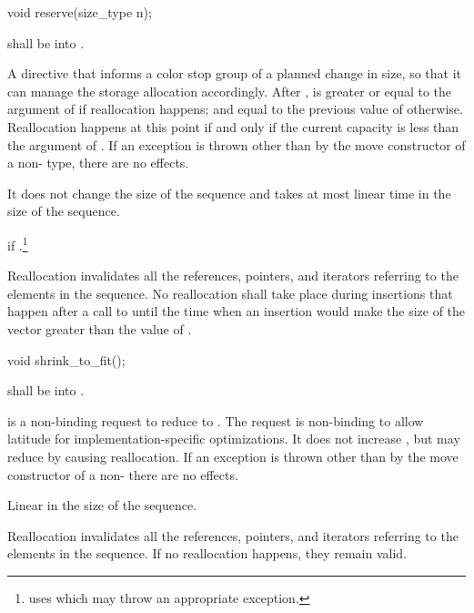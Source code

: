 \begin{itemdecl}
	void reserve(size_type n);
\end{itemdecl}
\begin{itemdescr}
	\pnum
	\requires
	 shall be  into .
	
	\pnum
	\effects
	A directive that informs a color stop group of a planned change in size, so that it can manage the storage
	allocation accordingly. After ,  is greater or equal to the argument of  if
	reallocation happens; and equal to the previous value of  otherwise. Reallocation happens
	at this point if and only if the current capacity is less than the argument of . If an exception
	is thrown other than by the move constructor of a non- type, there are no effects.
	
	\pnum
	\complexity
	It does not change the size of the sequence and takes at most linear time in the size of the
	sequence.
	
	\pnum
	\throws
	 if .\footnote{ uses  which
		may throw an appropriate exception.}
	
	\pnum
	\remarks
	Reallocation invalidates all the references, pointers, and iterators
	referring to the elements in the sequence.
	No reallocation shall take place during insertions that happen
	after a call to
	until the time when an insertion would make the size of the vector
	greater than the value of
	.
\end{itemdescr}

\begin{itemdecl}
	void shrink_to_fit();
\end{itemdecl}
\begin{itemdescr}
	\pnum
	\requires
	 shall be  into .
	
	\pnum
	\effects
	 is a non-binding request to reduce
	 to .
	\enternote
	The request is non-binding to allow latitude for
	implementation-specific optimizations.
	\exitnote
	It does not increase , but may reduce 
	by causing reallocation. 
	If an exception is thrown other than by the move constructor
	of a non-  there are no effects.
	
	\pnum
	\complexity Linear in the size of the sequence.
	
	\pnum
	\remarks Reallocation invalidates all the references, pointers, and 
	iterators referring to the elements in the sequence. If no reallocation 
	happens, they remain valid.
\end{itemdescr}

